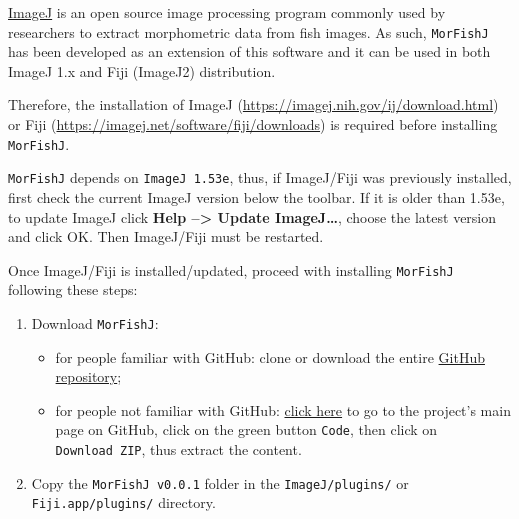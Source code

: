 \documentclass[
  letterpaper,
  DIV=11,
  numbers=noendperiod,
  oneside]{scrreprt}
\providecommand{\tightlist}{%
  \setlength{\itemsep}{0pt}\setlength{\parskip}{0pt}}\usepackage{longtable,booktabs,array}
\begin{document}
\href{https://imagej.nih.gov/ij/}{ImageJ} is an open source image
processing program commonly used by researchers to extract morphometric
data from fish images. As such, \texttt{MorFishJ} has been developed as
an extension of this software and it can be used in both ImageJ 1.x and
Fiji (ImageJ2) distribution.

Therefore, the installation of ImageJ
(\url{https://imagej.nih.gov/ij/download.html}) or Fiji
(\url{https://imagej.net/software/fiji/downloads}) is required before
installing \texttt{MorFishJ}.

\begin{tcolorbox}[standard jigsaw,arc=.35mm, toptitle=1mm, titlerule=0mm, bottomtitle=1mm, left=2mm, colbacktitle=quarto-callout-warning-color!10!white, colback=white, opacityback=0, leftrule=.75mm, title=\textcolor{quarto-callout-warning-color}{\faExclamationTriangle}\hspace{0.5em}{Warning}, coltitle=black, rightrule=.15mm, bottomrule=.15mm, toprule=.15mm, opacitybacktitle=0.6, colframe=quarto-callout-warning-color-frame]
\texttt{MorFishJ} depends on \texttt{ImageJ\ 1.53e}, thus, if
ImageJ/Fiji was previously installed, first check the current ImageJ
version below the toolbar. If it is older than 1.53e, to update ImageJ
click \textbf{Help --\textgreater{} Update ImageJ\ldots{}}, choose the
latest version and click OK. Then ImageJ/Fiji must be restarted.
\end{tcolorbox}

Once ImageJ/Fiji is installed/updated, proceed with installing
\texttt{MorFishJ} following these steps:

\begin{enumerate}
\def\labelenumi{\arabic{enumi}.}
\tightlist
\item
  Download \texttt{MorFishJ}:

  \begin{itemize}
  \tightlist
  \item
    for people familiar with GitHub: clone or download the entire
    \href{https://github.com/mattiaghilardi/MorFishJ}{GitHub
    repository};\\
  \item
    for people not familiar with GitHub:
    \href{https://github.com/mattiaghilardi/MorFishJ}{click here} to go
    to the project's main page on GitHub, click on the green button
    \texttt{Code}, then click on \texttt{Download\ ZIP}, thus extract
    the content.\\
  \end{itemize}
\item
  Copy the \texttt{MorFishJ\ v0.0.1} folder in the
  \texttt{ImageJ/plugins/} or \texttt{Fiji.app/plugins/} directory.
\end{enumerate}
\end{document}
